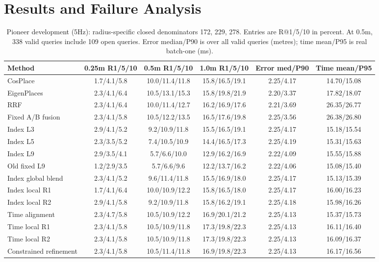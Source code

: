 \documentclass[conference,letterpaper]{IEEEtran}
\begin{document}
\section{Results and Failure Analysis}
\begin{table}[t]
\centering\caption{Pioneer development (5Hz): radius-specific closed denominators 172, 229, 278. Entries are R@1/5/10 in percent. At 0.5m, 338 valid queries include 109 open queries. Error median/P90 is over all valid queries (metres); time mean/P95 is real batch-one (ms).}
\label{tab:dev}
\scriptsize\setlength{\tabcolsep}{5pt}
\begin{tabular}{lccccc}\hline
Method & 0.25m R1/5/10 & 0.5m R1/5/10 & 1.0m R1/5/10 & Error med/P90 & Time mean/P95\\\hline
CosPlace & 1.7/4.1/5.8 & 10.0/11.4/11.8 & 15.8/16.5/19.1 & 2.25/4.17 & 14.70/15.08 \\
EigenPlaces & 2.3/4.1/6.4 & 10.5/13.1/15.3 & 15.8/19.8/21.9 & 2.20/3.37 & 17.82/18.07 \\
RRF & 2.3/4.1/6.4 & 10.0/11.4/12.7 & 16.2/16.9/17.6 & 2.21/3.69 & 26.35/26.77 \\
Fixed A/B fusion & 2.3/4.1/5.8 & 10.5/12.2/13.5 & 16.5/17.6/19.8 & 2.25/3.56 & 26.38/26.80 \\
Index L3 & 2.9/4.1/5.2 & 9.2/10.9/11.8 & 15.5/16.5/19.1 & 2.25/4.17 & 15.18/15.54 \\
Index L5 & 2.3/3.5/5.2 & 7.4/10.5/10.9 & 14.4/16.5/17.3 & 2.25/4.19 & 15.31/15.63 \\
Index L9 & 2.9/3.5/4.1 & 5.7/6.6/10.0 & 12.9/16.2/16.9 & 2.22/4.09 & 15.55/15.88 \\
Old fixed L9 & 1.2/2.9/3.5 & 5.7/6.6/9.6 & 12.2/13.7/16.2 & 2.22/4.06 & 15.08/15.40 \\
Index global blend & 2.3/4.1/5.2 & 9.6/11.4/11.8 & 15.5/16.9/18.0 & 2.25/4.17 & 15.13/15.39 \\
Index local R1 & 1.7/4.1/6.4 & 10.0/10.9/12.2 & 15.8/16.5/18.0 & 2.25/4.17 & 16.00/16.23 \\
Index local R2 & 2.9/4.1/5.8 & 9.2/10.9/11.8 & 15.8/16.2/19.1 & 2.25/4.18 & 15.98/16.26 \\
Time alignment & 2.3/4.7/5.8 & 10.5/10.9/12.2 & 16.9/20.1/21.2 & 2.25/4.13 & 15.37/15.73 \\
Time local R1 & 2.3/4.1/5.8 & 10.5/10.9/11.8 & 17.3/19.8/22.3 & 2.25/4.13 & 16.11/16.40 \\
Time local R2 & 2.3/4.1/5.8 & 10.5/10.9/11.8 & 17.3/19.8/22.3 & 2.25/4.13 & 16.09/16.37 \\
Constrained refinement & 2.3/4.1/5.8 & 10.5/11.4/11.8 & 16.9/19.8/22.3 & 2.25/4.13 & 16.17/16.56 \\
\hline\end{tabular}\end{table}
\end{document}
